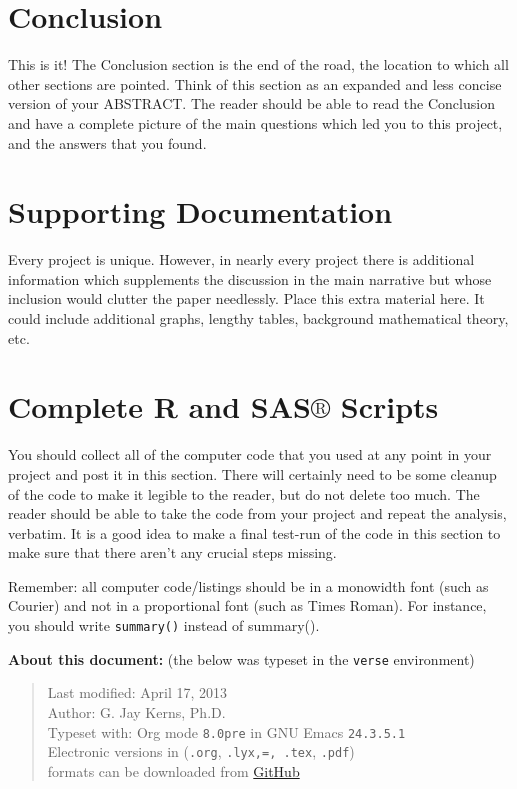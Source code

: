 \documentclass[11pt]{article}
\begin{document}
\newpage

\section[Conclusion]{Conclusion}
\label{sec-6}

This is it! The Conclusion section is the end of the road, the
location to which all other sections are pointed. Think of this
section as an expanded and less concise version of your ABSTRACT.  The
reader should be able to read the Conclusion and have a complete
picture of the main questions which led you to this project, and the
answers that you found.

\newpage
\appendix
\section[Supporting Documentation]{Supporting Documentation}
\label{sec-7}

Every project is unique. However, in nearly every project there is
additional information which supplements the discussion in the main
narrative but whose inclusion would clutter the paper
needlessly. Place this extra material here. It could include
additional graphs, lengthy tables, background mathematical theory,
etc.
\section[Complete R and SAS\(\circledR\) Scripts]{Complete R and SAS\(\circledR\) Scripts}
\label{sec-8}

You should collect all of the computer code that you used at any point
in your project and post it in this section. There will certainly need
to be some cleanup of the code to make it legible to the reader, but
do not delete too much. The reader should be able to take the code
from your project and repeat the analysis, verbatim. It is a good idea
to make a final test-run of the code in this section to make sure that
there aren't any crucial steps missing.

Remember: all computer code/listings should be in a monowidth font
(such as Courier) and not in a proportional font (such as Times
Roman). For instance, you should write \texttt{summary()} instead of
summary().

\bigskip

\textbf{About this document:} (the below was typeset in the \texttt{verse}
environment)

\begin{verse}
Last modified: April 17, 2013 \\
Author: G. Jay Kerns, Ph.D. \\
Typeset with: Org mode \texttt{8.0pre} in GNU Emacs \texttt{24.3.5.1} \\
Electronic versions in (\texttt{.org}, \texttt{.lyx,=, .tex}, \texttt{.pdf}) \\
formats can be downloaded from \href{https://github.com/gjkerns/gradproject}{GitHub} \\
\end{verse}

{}


\end{document}
